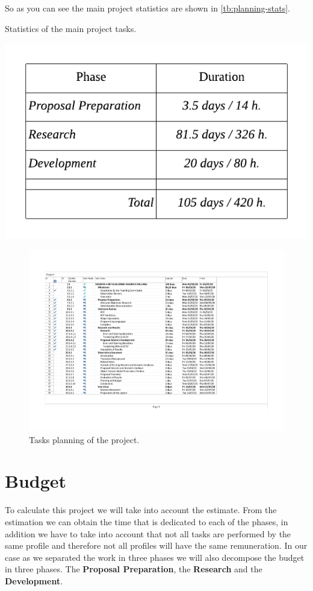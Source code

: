 \bigskip
So as you can see the main project statistics are shown in \cref{tb:planning-stats}.

\begin{table}
    \caption[Statistics of the main project tasks]{Statistics of the main project tasks.}
    \label{tb:planning-stats}
    \centering
    \includegraphics{images/planning-stats.pdf}
\end{table}

\begin{figure}
    \includegraphics[width=\textwidth]{images/planificacion.pdf}
    \centering
	\caption[Tasks planning of the project]{Tasks planning of the project.}
    \label{fig:planning-sheet}
\end{figure}

\section{Budget}
To calculate this project we will take into account the estimate. From the estimation we can obtain
the time that is dedicated to each of the phases, in addition we have to take into account that not
all tasks are performed by the same profile and therefore not all profiles will have the same remuneration.
In our case as we separated the work in three phases we will also decompose the budget in three phases. The
\textbf{Proposal Preparation}, the \textbf{Research} and the \textbf{Development}.

